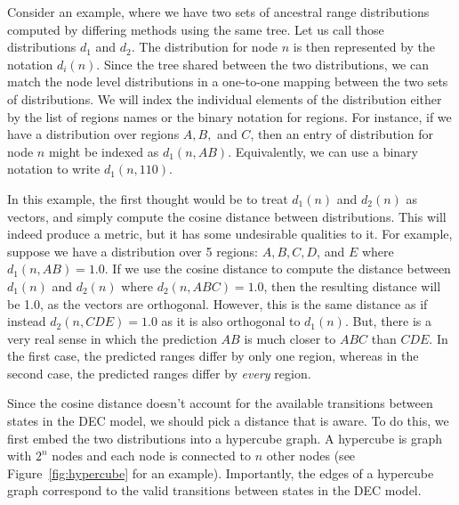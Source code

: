 \documentclass{article}
\begin{document}
Consider an example, where we have two sets of ancestral range distributions computed by differing methods using the
same tree. Let us call those distributions $d_1$ and $d_2$. The distribution for node $n$ is then represented by the
notation $d_i(n)$. Since the tree shared between the two distributions, we can match the node level distributions in a
one-to-one mapping between the two sets of distributions. We will index the individual elements of the distribution
either by the list of regions names or the binary notation for regions. For instance, if we have a distribution over
regions $A, B,$ and $C$, then an entry of distribution for node $n$ might be indexed as $d_1(n, AB)$. Equivalently, we
can use a binary notation to write $d_1(n, 110)$.

In this example, the first thought would be to treat $d_1(n)$ and $d_2(n)$ as vectors, and simply compute the cosine
distance between distributions. This will indeed produce a metric, but it has some undesirable qualities to it. For
example, suppose we have a distribution over 5 regions: $A, B, C, D$, and $E$ where $d_1(n, AB) = 1.0$. If we use the
cosine distance to compute the distance between $d_1(n)$ and $d_2(n)$ where $d_2(n, ABC) = 1.0$, then the resulting
distance will be 1.0, as the vectors are orthogonal. However, this is the same distance as if instead $d_2(n, CDE) =
1.0$ as it is also orthogonal to $d_1(n)$. But, there is a very real sense in which the prediction $AB$ is much closer
to $ABC$ than $CDE$. In the first case, the predicted ranges differ by only one region, whereas in the second case, the
predicted ranges differ by \textit{every} region.

Since the cosine distance doesn't account for the available transitions between states in the DEC model, we should pick
a distance that is aware. To do this, we first embed the two distributions into a hypercube graph. A hypercube is graph
with $2^n$ nodes and each node is connected to $n$ other nodes (see Figure~\ref{fig:hypercube} for an example).
Importantly, the edges of a hypercube graph correspond to the valid transitions between states in the DEC
model\footnotemark.

\end{document}
